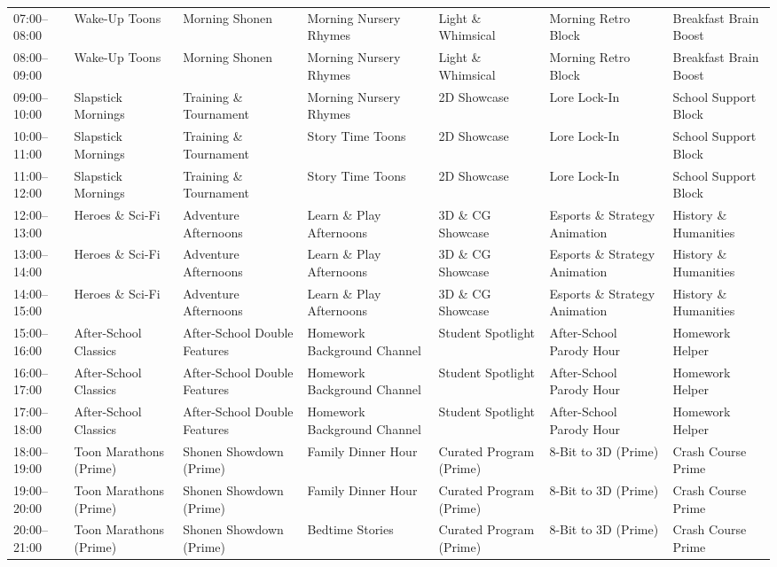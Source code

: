 \documentclass[12pt,letterpaper,twoside]{report}
\begin{document}
\begin{landscape}
\begin{longtable}{@{}L{2.4cm}L{2.65cm}L{2.65cm}L{2.65cm}L{2.65cm}L{2.65cm}L{2.65cm}@{}}
07:00--08:00 & Wake-Up Toons & Morning Shonen & Morning Nursery Rhymes & Light \& Whimsical & Morning Retro Block & Breakfast Brain Boost \\
08:00--09:00 & Wake-Up Toons & Morning Shonen & Morning Nursery Rhymes & Light \& Whimsical & Morning Retro Block & Breakfast Brain Boost \\
09:00--10:00 & Slapstick Mornings & Training \& Tournament & Morning Nursery Rhymes & 2D Showcase & Lore Lock-In & School Support Block \\
10:00--11:00 & Slapstick Mornings & Training \& Tournament & Story Time Toons & 2D Showcase & Lore Lock-In & School Support Block \\
11:00--12:00 & Slapstick Mornings & Training \& Tournament & Story Time Toons & 2D Showcase & Lore Lock-In & School Support Block \\
12:00--13:00 & Heroes \& Sci-Fi & Adventure Afternoons & Learn \& Play Afternoons & 3D \& CG Showcase & Esports \& Strategy Animation & History \& Humanities \\
13:00--14:00 & Heroes \& Sci-Fi & Adventure Afternoons & Learn \& Play Afternoons & 3D \& CG Showcase & Esports \& Strategy Animation & History \& Humanities \\
14:00--15:00 & Heroes \& Sci-Fi & Adventure Afternoons & Learn \& Play Afternoons & 3D \& CG Showcase & Esports \& Strategy Animation & History \& Humanities \\
15:00--16:00 & After-School Classics & After-School Double Features & Homework Background Channel & Student Spotlight & After-School Parody Hour & Homework Helper \\
16:00--17:00 & After-School Classics & After-School Double Features & Homework Background Channel & Student Spotlight & After-School Parody Hour & Homework Helper \\
17:00--18:00 & After-School Classics & After-School Double Features & Homework Background Channel & Student Spotlight & After-School Parody Hour & Homework Helper \\
18:00--19:00 & Toon Marathons (Prime) & Shonen Showdown (Prime) & Family Dinner Hour & Curated Program (Prime) & 8-Bit to 3D (Prime) & Crash Course Prime \\
19:00--20:00 & Toon Marathons (Prime) & Shonen Showdown (Prime) & Family Dinner Hour & Curated Program (Prime) & 8-Bit to 3D (Prime) & Crash Course Prime \\
20:00--21:00 & Toon Marathons (Prime) & Shonen Showdown (Prime) & Bedtime Stories & Curated Program (Prime) & 8-Bit to 3D (Prime) & Crash Course Prime \\

\end{longtable}
\end{landscape}
\end{document}
